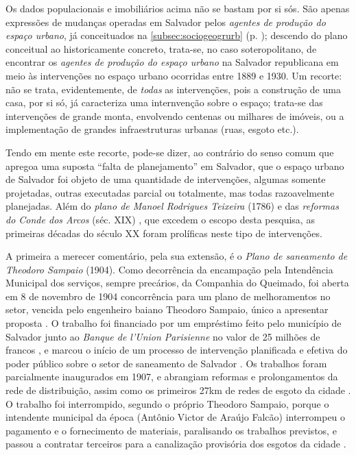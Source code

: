 Os dados populacionais e imobiliários acima não se bastam por si sós. São apenas expressões de mudanças operadas em Salvador pelos \textit{agentes de produção do espaço urbano}, já conceituados na \autoref{subsec:sociogeogrurb} (p. \pageref{subsec:sociogeogrurb}); descendo do plano conceitual ao historicamente concreto, trata-se, no caso soteropolitano, de encontrar os \textit{agentes de produção do espaço urbano} na Salvador republicana em meio às intervenções no espaço urbano ocorridas entre 1889 e 1930. Um recorte: não se trata, evidentemente, de \textit{todas} as intervenções, pois a construção de uma casa, por si só, já caracteriza uma internvenção sobre o espaço; trata-se das intervenções de grande monta, envolvendo centenas ou milhares de imóveis, ou a implementação de grandes infraestruturas urbanas (ruas, esgoto etc.).

Tendo em mente este recorte, pode-se dizer, ao contrário do senso comum que apregoa uma suposta ``falta de planejamento'' em Salvador, que o espaço urbano de Salvador foi objeto de uma quantidade de intervenções, algumas somente projetadas, outras executadas parcial ou totalmente, mas todas razoavelmente planejadas. Além do \textit{plano de Manoel Rodrigues Teixeira} (1786) \cite[p.~318]{ruy_politica_1949} e das \textit{reformas do Conde dos Arcos} (séc. XIX) \cite{sampaio_formas_1999,VASCONCELOS2002}, que excedem o escopo desta pesquisa, as primeiras décadas do século XX foram prolíficas neste tipo de intervenções.

A primeira a merecer comentário, pela sua extensão, é o \textit{Plano de saneamento de Theodoro Sampaio} (1904). Como decorrência da encampação pela Intendência Municipal dos serviços, sempre precários, da Companhia do Queimado, foi aberta em 8 de novembro de 1904 concorrência para um plano de melhoramentos no setor, vencida pelo engenheiro baiano Theodoro Sampaio, único a apresentar proposta \cite[150]{gordilhobarbosa_eau_2004}. O trabalho foi financiado por um empréstimo feito pelo município de Salvador junto ao \textit{Banque de l'Union Parisienne} no valor de 25 milhões de francos \cite[p.~150]{gordilhobarbosa_eau_2004}, e marcou o início de um processo de intervenção planificada e efetiva do poder público sobre o setor de saneamento de Salvador \cite[p.~150]{gordilhobarbosa_eau_2004}. Os trabalhos foram parcialmente inaugurados em 1907, e abrangiam reformas e prolongamentos da rede de distribuição, assim como os primeiros 27km de redes de esgoto da cidade \cite[p.~151]{gordilhobarbosa_eau_2004}. O trabalho foi interrompido, segundo o próprio Theodoro Sampaio, porque o intendente municipal da época (Antônio Victor de Araújo Falcão) interrompeu o pagamento e o fornecimento de materiais, paralisando os trabalhos previstos, e passou a contratar terceiros para a canalização provisória dos esgotos da cidade \cite[p.~152]{gordilhobarbosa_eau_2004}.

